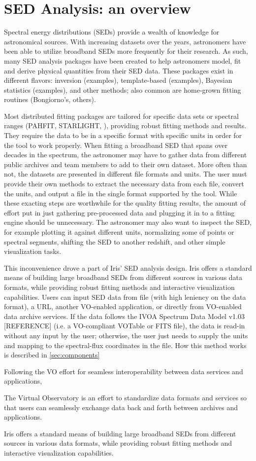 \label{everyday_seds}
\section{SED Analysis: an overview}

Spectral energy distributions (SEDs) provide a wealth of knowledge for astronomical sources. With increasing datasets over the years, astronomers have been able to utilize broadband SEDs more frequently for their research. As such, many SED analysis packages have been created to help astronomers model, fit and derive physical quantities from their SED data. These packages exist in different flavors: inversion (examples), template-based (examples), Bayesian statistics (examples), and other methods; also common are home-grown fitting routines (Bongiorno's, others). 

Most distributed fitting packages are tailored for specific data sets or spectral ranges (PAHFIT, STARLIGHT, ), providing robust fitting methods and results. They require the data to be in a specific format with specific units in order for the tool to work properly. When fitting a broadband SED that spans over decades in the spectrum, the astronomer may have to gather data from different public archives and team members to add to their own dataset. More often than not, the datasets are presented in different file formats and units. The user must provide their own methods to extract the necessary data from each file, convert the units, and output a file in the single format supported by the tool. While these exacting steps are worthwhile for the quality fitting results, the amount of effort put in just gathering pre-processed data and plugging it in to a fitting engine should be unnecessary. The astronomer may also want to inspect the SED, for example plotting it against different units, normalizing some of points or spectral segments, shifting the SED to another redshift, and other simple visualization tasks.

This inconvenience drove a part of Iris' SED analysis design. Iris offers a standard means of building large broadband SEDs from different sources in various data formats, while providing robust fitting methods and interactive visualization capabilities. Users can input SED data from file (with high leniency on the data format), a URL, another VO-enabled application, or directly from VO-enabled data archive services. If the data follows the IVOA Spectrum Data Model v1.03 [REFERENCE] (i.e. a VO-compliant VOTable or FITS file), the data is read-in without any input by the user; otherwise, the user just needs to supply the units and  mapping to the spectral-flux coordinates in the file. How this method works is described in \ref{sec:components}

Following the VO effort for seamless interoperability between data services and applications,  

The Virtual Observatory is an effort to standardize data formats and services so that users can seamlessly exchange data back and forth between archives and applications.  

Iris offers a standard means of building large broadband SEDs from different sources in various data formats, while providing robust fitting methods and interactive visualization capabilities. 